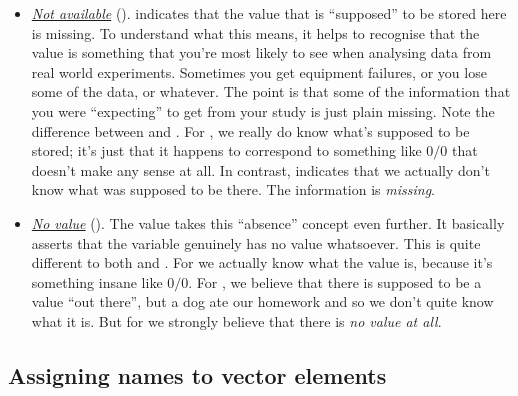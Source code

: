 \begin{itemize}
\item \underline{\it Not available} (). 
 indicates that the value that is ``supposed'' to be stored here is missing. To understand what this means, it helps to recognise that the  value is something that you're most likely to see when analysing data from real world experiments. Sometimes you get equipment failures, or you lose some of the data, or whatever. The point is that some of the information that you were ``expecting'' to get from your study is just plain missing. Note the difference between  and . For , we really do know what's supposed to be stored; it's just that it happens to correspond to something like $0/0$ that doesn't make any sense at all. In contrast,  indicates that we actually don't know what was supposed to be there. The information is {\it missing}.
\vspace*{6pt}

\item \underline{\it No value} ().
The  value takes this ``absence'' concept even further. It basically asserts that the variable genuinely has no value whatsoever. This is quite different to both  and . For  we actually know what the value is, because it's something insane like $0/0$. For , we believe that there is supposed to be a value ``out there'', but a dog ate our homework and so we don't quite know what it is. But for  we strongly believe that there is {\it no value at all}.  

\end{itemize}



\subsection{Assigning names to vector elements~\label{sec:names}}

